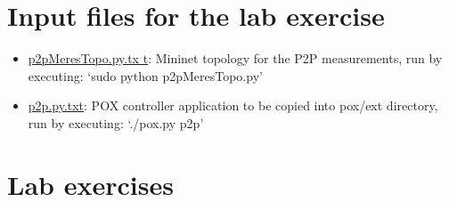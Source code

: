 \documentclass[a4paper]{article}
\begin{document}
\section{Input files for the lab exercise}
\begin{itemize}

    \item

          \href{https://qosip.tmit.bme.hu/foswiki/pub/Meres/P2PAlkalmazasokMeresiSegedlet/p2pMeresTopo.py.txt}{p2pMeresTopo.py.tx
              t}: Mininet topology for the P2P measurements, run by executing: `sudo python p2pMeresTopo.py'

    \item

          \href{https://qosip.tmit.bme.hu/foswiki/pub/Meres/P2PAlkalmazasokMeresiSegedlet/p2pMeresTopo.py.txt}{p2p.py.txt}: POX
          controller application to be copied into pox/ext directory, run by executing: `./pox.py p2p'
\end{itemize}

\section{Lab exercises}
\end{document}
